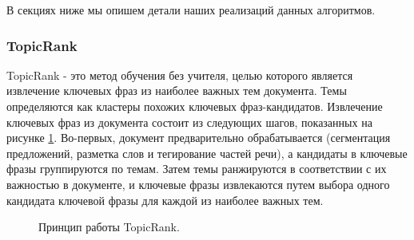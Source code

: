 \documentclass[aps,%
12pt,%
final,%
oneside,
onecolumn,%
musixtex, %
superscriptaddress,%
centertags]{article} %
\begin{document}
В секциях ниже мы опишем детали наших реализаций данных алгоритмов.

\subsubsection{TopicRank}
TopicRank - это метод обучения без учителя, целью которого является извлечение ключевых фраз из наиболее важных тем документа. Темы определяются как кластеры похожих ключевых фраз-кандидатов. Извлечение ключевых фраз из документа состоит из следующих шагов, показанных на рисунке \ref{topicrank}. Во-первых, документ предварительно обрабатывается (сегментация предложений, разметка слов и тегирование частей речи), а кандидаты в ключевые фразы группируются по темам. Затем темы ранжируются в соответствии с их важностью в документе, и ключевые фразы извлекаются путем выбора одного кандидата ключевой фразы для каждой из наиболее важных тем.

\begin{figure}[ht]
\begin{center}


\caption{
\label{topicrank}
        Принцип работы TopicRank.}
\end {center}
\end {figure}
\end{document}
